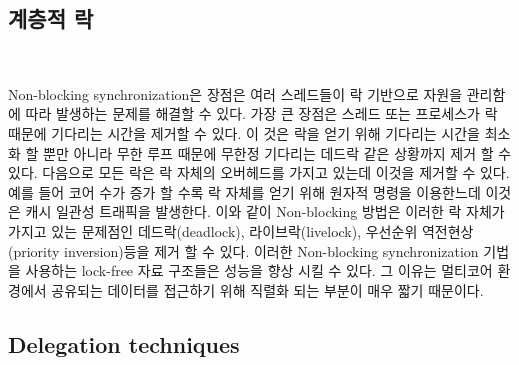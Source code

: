  
 
 
 
 
      

\subsection{계층적 락}

~\cite{Dice2015LCG}

Non-blocking synchronization은 장점은 여러 스레드들이 락 기반으로 자원을 관리함에 따라
 발생하는 문제를 해결할 수 있다. 
가장 큰 장점은 스레드 또는 프로세스가 락 때문에 기다리는 시간을 제거할 수 있다.
이 것은 락을 얻기 위해 기다리는 시간을 최소화 할 뿐만 아니라 무한 루프 때문에 무한정 기다리는 
데드락 같은 상황까지 제거 할 수 있다. 
다음으로 모든 락은 락 자체의 오버헤드를 가지고 있는데 이것을 제거할 수 있다. 
예를 들어 코어 수가 증가 할 수록 락 자체를 얻기 위해 원자적 명령을 이용한느데 이것은 캐시 일관성 트래픽을 
발생한다. 
이와 같이 Non-blocking 방법은 이러한 락 자체가 가지고 있는 문제점인 데드락(deadlock), 라이브락(livelock), 
우선순위 역전현상(priority inversion)등을 제거 할 수 있다. 
이러한 Non-blocking synchronization 기법을 사용하는 lock-free 자료 구조들은 성능을 향상 시킬 수 있다. 
그 이유는 멀티코어 환경에서 공유되는 데이터를 접근하기 위해 직렬화 되는 부분이 매우 짧기 때문이다. 


\subsection{Delegation techniques}

